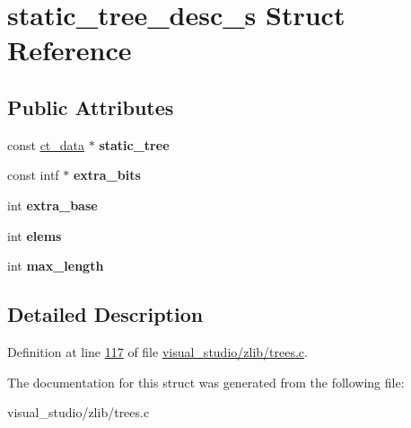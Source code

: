 \hypertarget{structstatic__tree__desc__s}{}\section{static\+\_\+tree\+\_\+desc\+\_\+s Struct Reference}
\label{structstatic__tree__desc__s}
\subsection*{Public Attributes}
\begin{DoxyCompactItemize}
\item 
\mbox{\label{structstatic__tree__desc__s_a6116ce0e39e87138cfb08dce7b1e42de}} 
const \hyperlink{structct__data__s}{ct\+\_\+data} $\ast$ {\bfseries static\+\_\+tree}
\item 
\mbox{\label{structstatic__tree__desc__s_a30bc89cdc889c9b6c2baf59590988a7a}} 
const intf $\ast$ {\bfseries extra\+\_\+bits}
\item 
\mbox{\label{structstatic__tree__desc__s_a1051cc83d9d410ccf21427df9bd85201}} 
int {\bfseries extra\+\_\+base}
\item 
\mbox{\label{structstatic__tree__desc__s_ab4bad1c091188c43413a09f626a5787f}} 
int {\bfseries elems}
\item 
\mbox{\label{structstatic__tree__desc__s_ae767848725194f63fa9cf08142767ad4}} 
int {\bfseries max\+\_\+length}
\end{DoxyCompactItemize}


\subsection{Detailed Description}


Definition at line \hyperlink{visual__studio_2zlib_2trees_8c_source_l00117}{117} of file \hyperlink{visual__studio_2zlib_2trees_8c_source}{visual\+\_\+studio/zlib/trees.\+c}.



The documentation for this struct was generated from the following file\+:\begin{DoxyCompactItemize}
\item 
visual\+\_\+studio/zlib/trees.\+c\end{DoxyCompactItemize}
